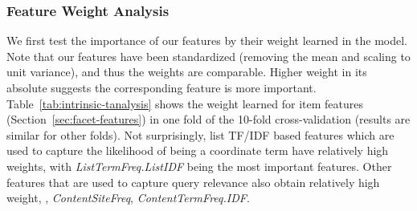 \subsubsection{Feature Weight Analysis}
We first test the importance of our features by their weight learned in the model. Note that our features have been standardized (removing the mean and scaling to unit variance), and thus the weights are comparable. Higher weight in its absolute suggests the corresponding feature is more important. Table~\ref{tab:intrinsic-tanalysis} shows the weight learned for item features (Section~\ref{sec:facet-features}) in one fold of the 10-fold cross-validation (results are similar for other folds). Not surprisingly, list TF/IDF based features which are used to capture the likelihood of being a coordinate term have relatively high weights, with \textit{ListTermFreq.ListIDF} being the most important features. Other features that are used to capture query relevance also obtain relatively high weight, \eg, \textit{ContentSiteFreq}, \textit{ContentTermFreq.IDF}. 
